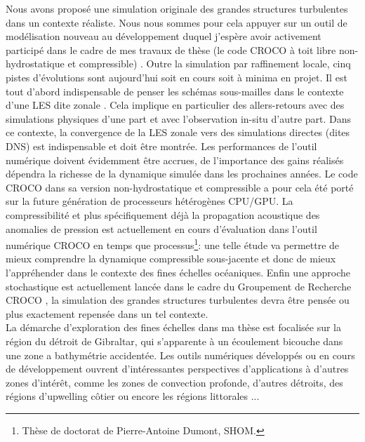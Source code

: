 Nous avons proposé une simulation originale des grandes structures turbulentes dans un contexte réaliste. Nous nous sommes pour cela appuyer sur un outil de modélisation nouveau au développement duquel j'espère avoir activement participé dans le cadre de mes travaux de thèse (le code CROCO à toit libre non-hydrostatique et compressible) \citep{hilt_2020}. Outre la simulation par raffinement locale, cinq pistes d'évolutions sont aujourd'hui soit en cours soit à minima en projet. Il est tout d'abord indispensable de penser les schémas sous-mailles dans le contexte d'une LES dite zonale \cite{friess_modelisation_2010}. Cela implique en particulier des allers-retours avec des simulations physiques d'une part et avec l'observation in-situ d'autre part. Dans ce contexte, la convergence de la LES zonale vers des simulations directes (dites DNS) est indispensable et doit être montrée. Les performances de l'outil numérique doivent évidemment être accrues, de l'importance des gains réalisés dépendra la richesse de la dynamique simulée dans les prochaines années. Le code CROCO dans sa version non-hydrostatique et compressible a pour cela été porté sur la future génération de processeurs hétérogènes CPU/GPU. La compressibilité et plus spécifiquement déjà la propagation acoustique des anomalies de pression est actuellement en cours d'évaluation dans l'outil numérique CROCO en temps que processus\footnote{Thèse de doctorat de Pierre-Antoine Dumont, SHOM.}: une telle étude va permettre de mieux comprendre la dynamique compressible sous-jacente et donc de mieux l'appréhender dans le contexte des fines échelles océaniques. Enfin une approche stochastique est actuellement lancée dans le cadre du Groupement de Recherche CROCO \citep{memin_fluid_2014}, la simulation des grandes structures turbulentes devra être pensée ou plus exactement repensée dans un tel contexte.\\
\color{black}
La démarche d'exploration des fines échelles dans ma thèse est focalisée sur la région du détroit de Gibraltar, qui s'apparente à un écoulement bicouche dans une zone a bathymétrie accidentée. Les outils numériques développés ou en cours de développement ouvrent d'intéressantes perspectives d'applications à d'autres zones d'intérêt, comme les zones de convection profonde, d'autres détroits, des régions d'upwelling côtier ou encore les régions littorales \citep{marchesiello_tridimensional_2021}...



